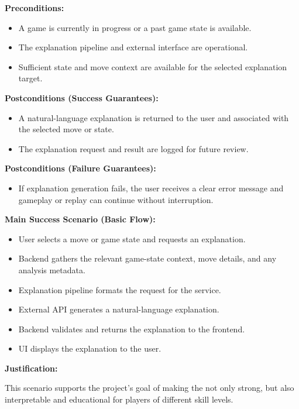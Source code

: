 \documentclass{article}
\begin{document}
\noindent\textbf{Preconditions:}
\begin{itemize}
    \item A game is currently in progress or a past game state is available.
    \item The explanation pipeline and external \LLM{} interface are operational.
    \item Sufficient state and move context are available for the selected explanation target.
\end{itemize}

\noindent\textbf{Postconditions (Success Guarantees):}
\begin{itemize}
    \item A natural-language explanation is returned to the user and associated with the selected move or state.
    \item The explanation request and result are logged for future review.
\end{itemize}

\noindent\textbf{Postconditions (Failure Guarantees):}
\begin{itemize}
    \item If explanation generation fails, the user receives a clear error message and gameplay or replay can continue without interruption.
\end{itemize}

\noindent\textbf{Main Success Scenario (Basic Flow):}
\begin{itemize}
    \item User selects a move or game state and requests an explanation.
    \item Backend gathers the relevant game-state context, move details, and any analysis metadata.
    \item Explanation pipeline formats the request for the \LLM{} service.
    \item External \LLM{} API generates a natural-language explanation.
    \item Backend validates and returns the explanation to the frontend.
    \item UI displays the explanation to the user.
\end{itemize}

\noindent\textbf{Justification:}

This scenario supports the project's goal of making the \AI{} not only strong, but also interpretable and educational for players of different skill levels.

\vspace{1em}
\end{document}
